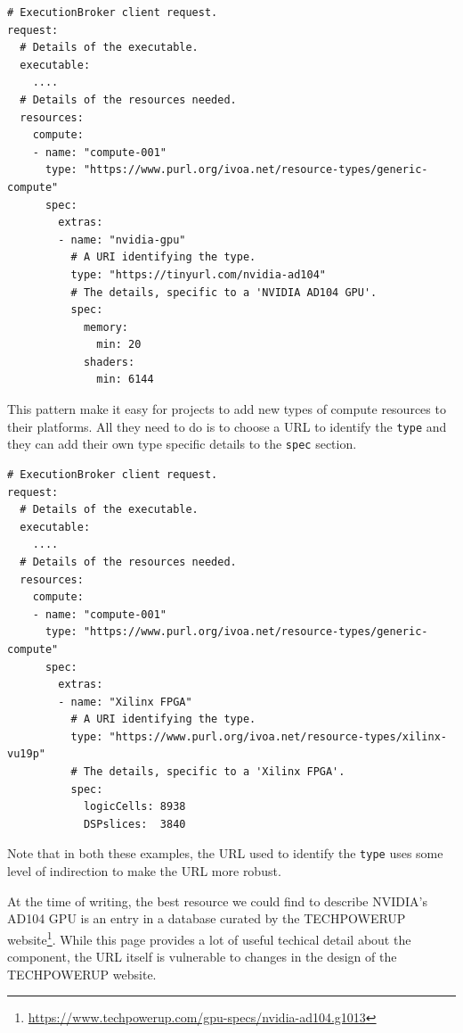 \documentclass[11pt,a4paper]{ivoa}
\newcommand{\codeword}[1] {\texttt{#1}}
\newcommand{\footurl}[1] {\footnote{\url{#1}}}
\begin{document}
\begin{lstlisting}[]
# ExecutionBroker client request.
request:
  # Details of the executable.
  executable:
    ....
  # Details of the resources needed.
  resources:
    compute:
    - name: "compute-001"
      type: "https://www.purl.org/ivoa.net/resource-types/generic-compute"
      spec:
        extras:
        - name: "nvidia-gpu"
          # A URI identifying the type.
          type: "https://tinyurl.com/nvidia-ad104"
          # The details, specific to a 'NVIDIA AD104 GPU'.
          spec:
            memory:
              min: 20
            shaders:
              min: 6144
\end{lstlisting}

This pattern make it easy for projects to add new types of compute resources to their
platforms. All they need to do is to choose a URL to identify the \codeword{type}
and they can add their own type specific details to the \codeword{spec} section.

\begin{lstlisting}[]
# ExecutionBroker client request.
request:
  # Details of the executable.
  executable:
    ....
  # Details of the resources needed.
  resources:
    compute:
    - name: "compute-001"
      type: "https://www.purl.org/ivoa.net/resource-types/generic-compute"
      spec:
        extras:
        - name: "Xilinx FPGA"
          # A URI identifying the type.
          type: "https://www.purl.org/ivoa.net/resource-types/xilinx-vu19p"
          # The details, specific to a 'Xilinx FPGA'.
          spec:
            logicCells: 8938
            DSPslices:  3840
\end{lstlisting}

Note that in both these examples, the URL used to identify the \codeword{type}
uses some level of indirection to make the URL more robust.

At the time of writing, the best resource we could find to describe NVIDIA's AD104 GPU
is an entry in a database curated by the TECHPOWERUP
website\footurl{https://www.techpowerup.com/gpu-specs/nvidia-ad104.g1013}.
While this page provides a lot of useful techical detail about the component,
the URL itself is vulnerable to changes in the design of the TECHPOWERUP website.
\end{document}
